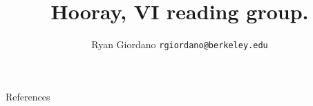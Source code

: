 \documentclass[8pt]{beamer}\usepackage[]{graphicx}\usepackage[]{color}
\title{Hooray, VI reading group.}
\author{Ryan Giordano \texttt{rgiordano@berkeley.edu}}
\begin{document}


\begin{frame}{References}

\footnotesize


\begingroup
\renewcommand{\section}[2]{}%

\endgroup

%
\end{frame}
    
\end{document}
